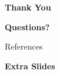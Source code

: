 \documentclass[en,16:9,smallfoot]{sdqbeamer}
\begin{document}
   \begin{frame}[plain]
        \centering

        \vspace{0.7cm}
        \begin{Huge}
        \textbf{Thank You \faSmileO}\\
        \end{Huge}

        \vspace{0.7cm}
        \begin{Large}
        \textbf{Questions?}\\
        \end{Large}
   \end{frame}

   \begin{frame}[allowframebreaks]{References}
   \footnotesize
   \printbibliography
   \end{frame}

   \appendix

   \begin{frame}[plain]
        \vspace{0.7cm}
        \begin{infobox-map}
        \centering
        \begin{Huge}
        \textbf{Extra Slides}\\
        \end{Huge}
        \end{infobox-map}
   \end{frame}
\end{document}
